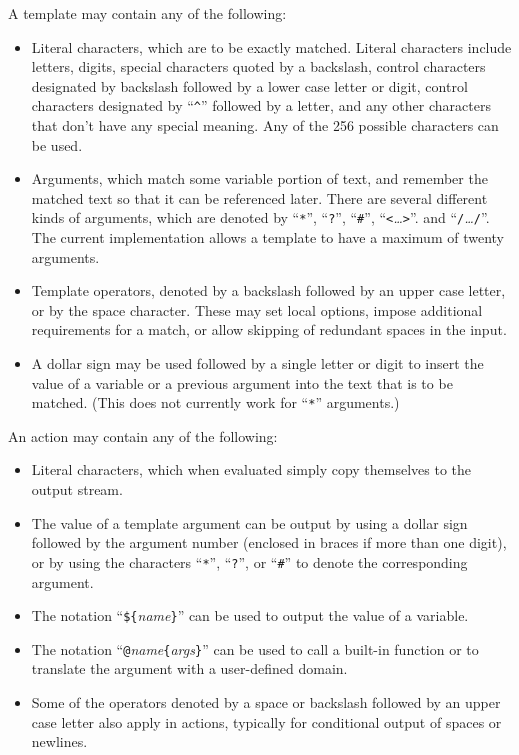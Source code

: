 A template may contain any of the following:
\begin{itemize}
\item Literal characters, which are to be exactly matched.
Literal characters include letters, digits, special characters quoted by
a backslash, control characters designated by backslash followed by
a lower case letter or digit, control characters designated by
``\verb/^/'' followed by a letter, and any other characters that don't have
any special meaning.  Any of the 256 possible characters can be used.
\item Arguments, which match some variable portion of text, and remember
the matched text so that it can be referenced later.
There are several different kinds of arguments, which are denoted by
``\verb/*/'', ``\verb/?/'', ``\verb/#/'', ``{\tt <}{\em \ldots}{\tt >}''.
and ``{\tt /}{\em \ldots}{\tt /}''.
The current implementation allows a template to have a maximum of twenty
arguments.
\item Template operators, denoted by a backslash followed by an upper
case letter, or by the space character.  These may set local options,
impose additional
requirements for a match, or allow skipping of redundant spaces in
the input.
\item A dollar sign may be used followed by a single letter or digit to
insert the value of a variable or a previous argument into the text that
is to be matched.  (This does not currently work for ``\verb/*/'' arguments.)
\end{itemize}

An action may contain any of the following:
\begin{itemize}
\item Literal characters, which when evaluated simply copy themselves to
the output stream.
\item The value of a template argument can be output by using a dollar
sign followed by the argument number (enclosed in braces if more than
one digit), or by using the characters ``\verb/*/'', ``\verb/?/'',
or ``\verb/#/'' to denote the corresponding argument.
\item The notation ``\verb/${/{\em name}\verb/}/'' can be used to output
the value of a variable.
\item The notation ``\verb/@/{\em name}\verb/{/{\em args}\verb/}/'' can
be used to call a built-in function or to translate the argument with a
user-defined domain.
\item Some of the operators denoted by a space or backslash followed by an upper
case letter also apply in actions, typically for conditional output of
spaces or newlines.
\end{itemize}

